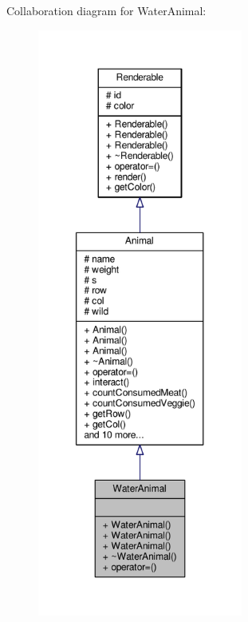 Collaboration diagram for Water\+Animal\+:
\nopagebreak
\begin{figure}[H]
\begin{center}
\leavevmode
\includegraphics[height=550pt]{classWaterAnimal__coll__graph}
\end{center}
\end{figure}
